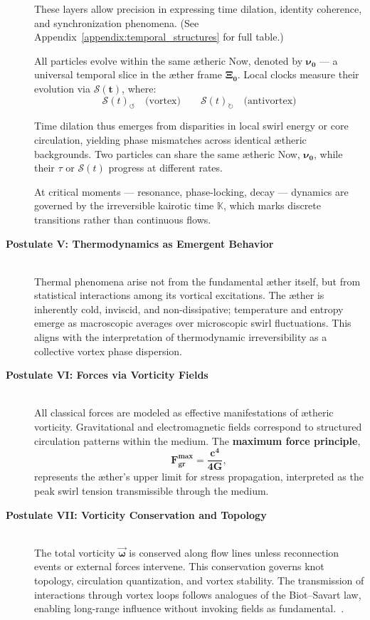 \begin{description}
    These layers allow precision in expressing time dilation, identity coherence, and synchronization phenomena. (See Appendix~\ref{appendix:temporal_structures} for full table.)

    All particles evolve within the same ætheric Now, denoted by $\boldsymbol{\nu_0}$ — a universal temporal slice in the æther frame $\boldsymbol{\Xi_0}$. Local clocks measure their evolution via $\boldsymbol{\mathcal{S}(t)}$, where:
    \[
    \mathcal{S}(t)_{\circlearrowleft} \quad \text{(vortex)} \qquad \mathcal{S}(t)_{\circlearrowright} \quad \text{(antivortex)}
    \]

    Time dilation thus emerges from disparities in local swirl energy or core circulation, yielding phase mismatches across identical ætheric backgrounds. Two particles can share the same ætheric Now, $\boldsymbol{\nu_0}$, while their $\tau$ or $\mathcal{S}(t)$ progress at different rates.

    At critical moments — resonance, phase-locking, decay — dynamics are governed by the irreversible kairotic time $\boldsymbol{\mathbb{K}}$, which marks discrete transitions rather than continuous flows.


    \item[\textbf{Postulate V: Thermodynamics as Emergent Behavior}] \hfill \\
    Thermal phenomena arise not from the fundamental æther itself, but from statistical interactions among its vortical excitations. The æther is inherently cold, inviscid, and non-dissipative; temperature and entropy emerge as macroscopic averages over microscopic swirl fluctuations. This aligns with the interpretation of thermodynamic irreversibility as a collective vortex phase dispersion.

    \item[\textbf{Postulate VI: Forces via Vorticity Fields}] \hfill \\
    All classical forces are modeled as effective manifestations of ætheric vorticity. Gravitational and electromagnetic fields correspond to structured circulation patterns within the medium. The \textbf{maximum force principle},
    \[
    \boldsymbol{F^{\text{max}}_{\text{gr}} = \frac{c^4}{4G}},
    \]
    represents the æther’s upper limit for stress propagation, interpreted as the peak swirl tension transmissible through the medium.

    \item[\textbf{Postulate VII: Vorticity Conservation and Topology}] \hfill \\
    The total vorticity $\boldsymbol{\vec{\omega}}$ is conserved along flow lines unless reconnection events or external forces intervene. This conservation governs knot topology, circulation quantization, and vortex stability. The transmission of interactions through vortex loops follows analogues of the Biot–Savart law, enabling long-range influence without invoking fields as fundamental.~\cite{helmholtz1858vortices}.
\end{description}


